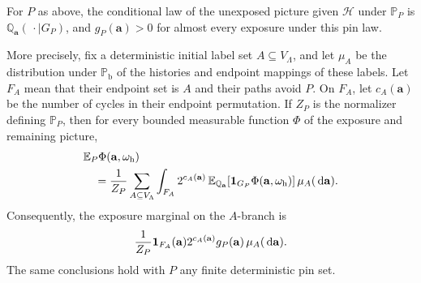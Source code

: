 \begin{proposition}
\label{prop:exposure}
For \(P\) as above, the conditional law of the unexposed picture given
\(\mathcal H\) under \(\mathbb P_P\) is
\(\mathbb Q_{\mathbf a}(\,\cdot\mid G_P)\), and
\(g_P(\mathbf a)>0\) for almost every exposure under this pin law.

More precisely, fix a deterministic initial label set
\(A\subseteq V_\Lambda\), and let \(\mu_A\) be the distribution under
\(\mathbb P_{\mathrm b}\) of the histories and endpoint mappings of
these labels.  Let \(F_A\) mean that their endpoint set is \(A\) and
their paths avoid \(P\).  On \(F_A\), let \(c_A(\mathbf a)\) be the
number of cycles in their endpoint permutation.  If \(Z_P\) is the
normalizer defining \(\mathbb P_P\), then for every bounded measurable
function \(\Phi\) of the exposure and remaining picture,
\begin{align}
 &\mathbb E_P\Phi(\mathbf a,\omega_{\mathrm h}) \notag\\
 &\quad=\frac1{Z_P}\sum_{A\subseteq V_\Lambda}
 \int_{F_A}2^{c_A(\mathbf a)}\,
 \mathbb E_{\mathbb Q_{\mathbf a}}
       [\mathbf 1_{G_P}\Phi(\mathbf a,\omega_{\mathrm h})]\,
                         \mu_A(\,\mathrm d\mathbf a).
 \label{eq:exposure-disintegration}
\end{align}
Consequently, the exposure marginal on the \(A\)-branch is
\begin{equation}
 \frac1{Z_P}\mathbf 1_{F_A}(\mathbf a)2^{c_A(\mathbf a)}
                       g_P(\mathbf a)\,\mu_A(\,\mathrm d\mathbf a).
 \label{eq:exposure-outer-law}
\end{equation}
The same conclusions hold with \(P\) any finite deterministic pin set.
\end{proposition}

